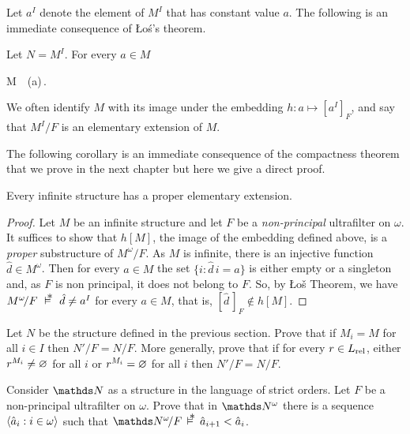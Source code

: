 Let \emph{$a^I$\/} denote the element of $M^I$ that has constant value $a$.
The following is an immediate consequence of \L o\'{s}'s theorem.

\begin{corollary}\label{ultrapotenzeelementari}
Let $N=M^I$.
For every $a\in M$

%
{\IFF}%
{M\ \models\ \phi(a)\,.}
\end{corollary}

We often identify $M$ with its image under the embedding $h:a\mapsto [a^I]_F$, and say that $M^I/F$ is an elementary extension of $M$.

The following corollary is an immediate consequence of the compactness theorem that we prove in the next chapter but here we give a direct proof.

\begin{corollary}
Every infinite structure has a proper elementary extension.
\end{corollary}

\begin{proof}
Let $M$ be an infinite structure and let $F$ be a \textit{non-principal\/} ultrafilter on $\omega$.
It suffices to show that $h[M]$, the image of the embedding defined above, is a \textit{proper\/} substructure of $M^\omega\!/F$.
As $M$ is infinite, there is an injective function  $\hat d\in M^\omega$.
Then for every $a\in M$ the set $\big\{i:\hat d\,i=a\big\}$ is either empty or a singleton and, as $F$ is non principal, it does not belong to $F$.
So, by \L o\v{s} Theorem, we have $M^\omega\!/F\ \pmodels\ \hat d\neq a^I$ for every $a\in M$, that is, $[\hat d\,]_F\notin h[M]$.
\end{proof}

\begin{exercise}\label{ex_N_vs_N}
  Let $N$ be the structure defined in the previous section.
  Prove that if $M_i=M$ for all $i\in I$ then $N'/F=N/F$.
  More generally, prove that if for every $r\in L_{\rm rel}$, either $r^{M_i}\neq\varnothing$ for all $i$ or $r^{M_i}=\varnothing$ for all $i$ then $N'/F=N/F$.
\end{exercise}

\begin{exercise}
Consider $\NN$ as a structure in the language of strict orders.
Let $F$ be a non-principal ultrafilter on $\omega$.
Prove that in $\NN^\omega$ there is a sequence $\langle\hat a_i: i\in\omega\rangle$ such that $\NN^\omega\!/F\,\pmodels\,\hat a_{i+1}<\hat a_i$.
\end{exercise}

